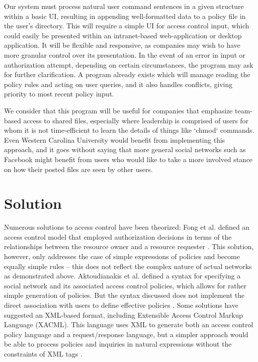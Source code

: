 \documentclass[12pt]{article}
\begin{document}
Our system must process natural user command sentences in a given structure within a basic UI, resulting in appending well-formatted data to a policy file in the user's directory. This will require a simple UI for access control input, which could easily be presented within an intranet-based web-application or desktop application. It will be flexible and responsive, as companies may wish to have more granular control over its presentation. In the event of an error in input or authorization attempt, depending on certain circumstances, the program may ask for further clarification. A program already exists which will manage reading the policy rules and acting on user queries, and it also handles conflicts, giving priority to most recent policy input.

We consider that this program will be useful for companies that emphasize team-based access to shared files, especially where leadership is comprised of users for whom it is not time-efficient to learn the details of things like `chmod` commands. Even Western Carolina University would benefit from implementing this approach, and it goes without saying that more general social networks such as Facebook might benefit from users who would like to take a more involved stance on how their posted files are seen by other users.

\section{Solution}

Numerous solutions to access control have been theorized: Fong et al. defined an access control model that employed authorization decisions in terms of the relationships between the resource owner and a resource requester \cite{fong11}. This solution, however, only addresses the case of simple expressions of policies and become equally simple rules -- this does not reflect the complex nature of actual networks as demonstrated above. Aktoudianakis et al. defined a syntax for specifying a social network and its associated access control policies, which allows for rather simple generation of policies. But the syntax discussed does not implement the direct association with users to define effective policies \cite{aktoudianakis13}. Some solutions have suggested an XML-based format, including Extensible Access Control Markup Language (XACML). This language uses XML to generate both an access control policy language and a request/response language, but a simpler approach would be able to process policies and inquiries in natural expressions without the constraints of XML tags \cite{damiani02}.
\end{document}
